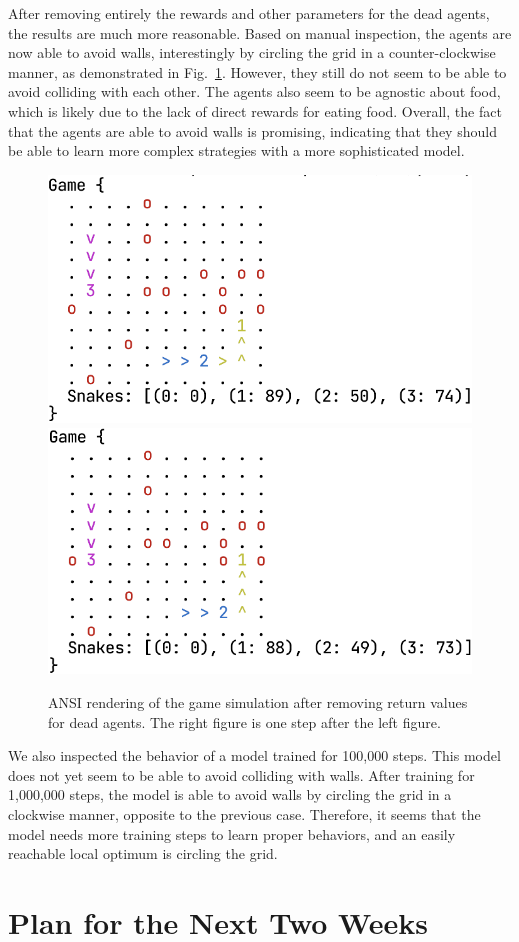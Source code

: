 \documentclass[a4paper]{article}
\begin{document}
After removing entirely the rewards and other parameters for the dead agents,
the results are much more reasonable. Based on manual inspection,
the agents are now able to avoid walls,
interestingly by circling the grid in a counter-clockwise manner, as demonstrated in Fig.~\ref{fig:render2}. However,
they still do not seem to be able to avoid colliding with each other.
The agents also seem to be agnostic about food,
which is likely due to the lack of direct rewards for eating food.
Overall, the fact that the agents are able to avoid walls is promising,
indicating that they should be able to learn more complex strategies with
a more sophisticated model.

\begin{figure}
    \centering
    \includegraphics[width=0.4\linewidth]{game_render_eg2.png}\quad
    \includegraphics[width=0.4\linewidth]{game_render_eg3.png}
    \caption{ANSI rendering of the game simulation after removing return values
        for dead agents. The right figure is one step after the left figure.
    }
    \label{fig:render2}
\end{figure}

We also inspected the behavior of a model trained for 100,000 steps.
This model does not yet seem to be able to avoid colliding with walls.
After training for 1,000,000 steps, the model is able to avoid walls by
circling the grid in a clockwise manner,
opposite to the previous case.
Therefore,
it seems that the model needs more training steps to learn proper behaviors,
and an easily reachable local optimum is circling the grid.

\section{Plan for the Next Two Weeks}
\end{document}
